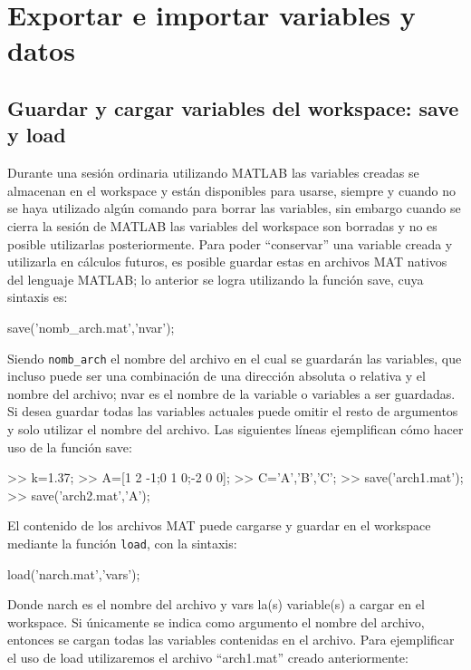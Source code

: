 \chapter{Exportar e importar variables y datos}

\section{Guardar y cargar variables del workspace: save y load}

Durante una sesión ordinaria utilizando MATLAB las variables creadas se
almacenan en el workspace y están disponibles para usarse, siempre y
cuando no se haya utilizado algún comando para borrar las variables, sin
embargo cuando se cierra la sesión de MATLAB las variables del workspace
son borradas y no es posible utilizarlas posteriormente. Para poder
``conservar'' una variable creada y utilizarla en cálculos futuros, es
posible guardar estas en archivos MAT nativos del lenguaje MATLAB; lo
anterior se logra utilizando la función save, cuya sintaxis es:

\begin{matlab}
save('nomb_arch.mat','nvar');
\end{matlab}

Siendo \texttt{nomb\_arch} el nombre del archivo en el cual se guardarán
las variables, que incluso puede ser una combinación de una dirección
absoluta o relativa y el nombre del archivo; nvar es el nombre de la
variable o variables a ser guardadas. Si desea guardar todas las
variables actuales puede omitir el resto de argumentos y solo utilizar
el nombre del archivo. Las siguientes líneas ejemplifican cómo hacer uso
de la función save:

\begin{matlab}
>> k=1.37;
>> A=[1 2 -1;0 1 0;-2 0 0];
>> C={'A','B','C'};
>> save('arch1.mat'); %
>> save('arch2.mat','A'); %
\end{matlab}

El contenido de los archivos MAT puede cargarse y guardar en el
workspace mediante la función \texttt{load}, con la sintaxis:

\begin{matlab}
load('narch.mat','vars');
\end{matlab}

Donde narch es el nombre del archivo y vars la(s) variable(s) a cargar
en el workspace. Si únicamente se indica como argumento el nombre del
archivo, entonces se cargan todas las variables contenidas en el
archivo. Para ejemplificar el uso de load utilizaremos el archivo
``arch1.mat'' creado anteriormente:

